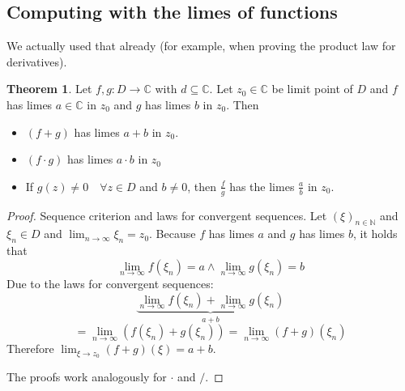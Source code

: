 \documentclass[a4paper,landscape,twocolumn]{article}
\theoremstyle{definition}
\newtheorem{theorem}{Theorem}
\newcommand\seq[1]{{\left(#1\right)}_{n \in \mathbb N}}
\begin{document}
\subsection{Computing with the limes of functions}

We actually used that already (for example, when proving the product law for derivatives).

\begin{theorem}
  Let $f, g: D \to \mathbb C$ with $d \subseteq \mathbb C$.
  Let $z_0 \in \mathbb C$ be limit point of $D$ and $f$ has limes $a \in \mathbb C$ in $z_0$
  and $g$ has limes $b$ in $z_0$.
  Then
  \begin{itemize}
    \item $(f + g)$ has limes $a + b$ in $z_0$.
    \item $(f \cdot g)$ has limes $a \cdot b$ in $z_0$
    \item If $g(z) \neq 0 \quad\forall z \in D$ and $b \neq 0$,
      then $\frac{f}{g}$ has the limes $\frac ab$ in $z_0$.
  \end{itemize}
\end{theorem}
\begin{proof}
  Sequence criterion and laws for convergent sequences.
  Let $\seq{\xi}$ and $\xi_n \in D$ and $\lim_{n\to\infty} \xi_n = z_0$.
  Because $f$ has limes $a$ and $g$ has limes $b$, it holds that
  \[ \lim_{n\to\infty} f(\xi_n) = a \land \lim_{n\to\infty} g(\xi_n) = b \]
  Due to the laws for convergent sequences:
  \[ \underbrace{\lim_{n\to\infty} f(\xi_n) + \lim_{n\to\infty} g(\xi_n)}_{a + b} \]
  \[
    = \lim_{n\to\infty} \left(f(\xi_n) + g(\xi_n)\right)
    = \lim_{n\to\infty} (f + g)(\xi_n)
  \]
  Therefore $\lim_{\xi \to z_0} (f + g)(\xi) = a + b$.

  The proofs work analogously for $\cdot$ and $/$.
\end{proof}
\end{document}
